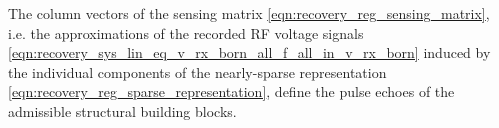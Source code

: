 The column vectors of
the sensing matrix
\eqref{eqn:recovery_reg_sensing_matrix}, i.e.
the  approximations of
the recorded \ac{RF} voltage signals
\eqref{eqn:recovery_sys_lin_eq_v_rx_born_all_f_all_in_v_rx_born} induced by
the individual components of
the nearly-sparse representation
\eqref{eqn:recovery_reg_sparse_representation}, define
the pulse echoes of
the admissible structural building blocks.
